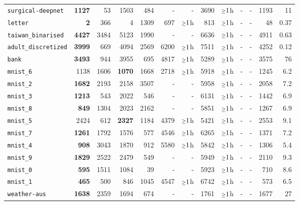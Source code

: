 \begin{tabular}{lrrrrrrrrrrrr}
\texttt{surgical-deepnet} & \textbf{1127} & 53 & 1503 & 484 & - & - & 3690 & $\mathsmaller{\geq}1$h & - & - & 1193 & 11\\
\texttt{letter} & \textbf{2} & 366 & 4 & 1309 & 697 & $\mathsmaller{\geq}1$h & 813 & $\mathsmaller{\geq}1$h & - & - & 48 & 0.37\\
\texttt{taiwan\_binarised} & \textbf{4427} & 3484 & 5123 & 1990 & - & - & 6636 & $\mathsmaller{\geq}1$h & - & - & 4911 & 0.63\\
\texttt{adult\_discretized} & \textbf{3999} & 669 & 4094 & 2569 & 6200 & $\mathsmaller{\geq}1$h & 7511 & $\mathsmaller{\geq}1$h & - & - & 4252 & 0.12\\
\texttt{bank} & \textbf{3493} & 944 & 3955 & 695 & 4817 & $\mathsmaller{\geq}1$h & 5289 & $\mathsmaller{\geq}1$h & - & - & 3575 & 76\\
\texttt{mnist\_6} & 1138 & 1606 & \textbf{1070} & 1668 & 2718 & $\mathsmaller{\geq}1$h & 5918 & $\mathsmaller{\geq}1$h & - & - & 1245 & 6.2\\
\texttt{mnist\_2} & \textbf{1682} & 2193 & 2158 & 3507 & - & - & 5958 & $\mathsmaller{\geq}1$h & - & - & 2058 & 7.2\\
\texttt{mnist\_3} & \textbf{1213} & 543 & 2022 & 546 & - & - & 6131 & $\mathsmaller{\geq}1$h & - & - & 1442 & 6.9\\
\texttt{mnist\_8} & \textbf{849} & 1304 & 2023 & 2162 & - & - & 5851 & $\mathsmaller{\geq}1$h & - & - & 1267 & 6.9\\
\texttt{mnist\_5} & 2424 & 612 & \textbf{2327} & 1184 & 4379 & $\mathsmaller{\geq}1$h & 5421 & $\mathsmaller{\geq}1$h & - & - & 2553 & 9.1\\
\texttt{mnist\_7} & \textbf{1261} & 1792 & 1576 & 577 & 4546 & $\mathsmaller{\geq}1$h & 6265 & $\mathsmaller{\geq}1$h & - & - & 1371 & 7.2\\
\texttt{mnist\_4} & \textbf{908} & 3043 & 1870 & 912 & 5580 & $\mathsmaller{\geq}1$h & 5842 & $\mathsmaller{\geq}1$h & - & - & 1306 & 5.4\\
\texttt{mnist\_9} & \textbf{1829} & 2522 & 2479 & 549 & - & - & 5949 & $\mathsmaller{\geq}1$h & - & - & 2110 & 9.3\\
\texttt{mnist\_0} & \textbf{595} & 1511 & 1084 & 39 & - & - & 5923 & $\mathsmaller{\geq}1$h & - & - & 710 & 8.6\\
\texttt{mnist\_1} & \textbf{465} & 500 & 846 & 1045 & 4547 & $\mathsmaller{\geq}1$h & 6742 & $\mathsmaller{\geq}1$h & - & - & 573 & 6.5\\
\texttt{weather-aus} & \textbf{1638} & 2359 & 1694 & 674 & - & - & 1761 & $\mathsmaller{\geq}1$h & - & - & 1677 & 27\\
\bottomrule
\end{tabular}
